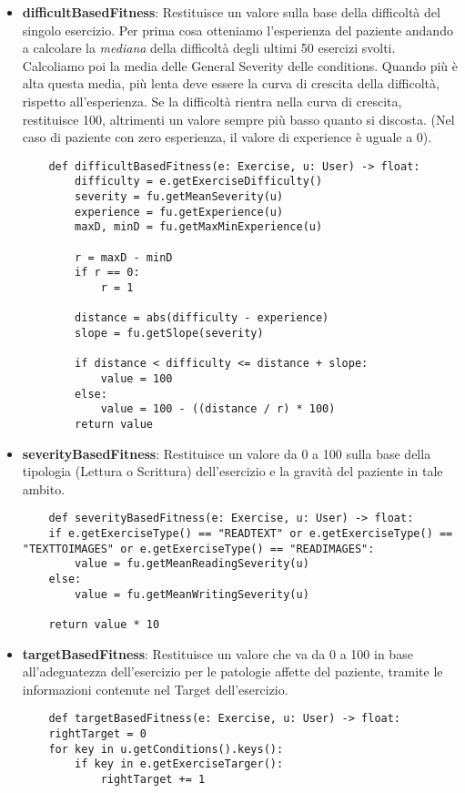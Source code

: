 \documentclass{article}
\begin{document}
\begin{itemize}

\item\textbf{difficultBasedFitness}: Restituisce un valore sulla base della difficoltà del singolo esercizio. Per prima cosa otteniamo l'esperienza del paziente andando a calcolare la \textit{mediana} della difficoltà degli ultimi 50 esercizi svolti. Calcoliamo poi la media delle General Severity delle conditions. Quando più è alta questa media, più lenta deve essere la curva di crescita della difficoltà, rispetto all'esperienza. Se la difficoltà rientra nella curva di crescita, restituisce 100, altrimenti un valore sempre più basso quanto si discosta. (Nel caso di paziente con zero esperienza, il valore di experience è uguale a 0).
\begin{lstlisting}
    def difficultBasedFitness(e: Exercise, u: User) -> float:
        difficulty = e.getExerciseDifficulty()
        severity = fu.getMeanSeverity(u)
        experience = fu.getExperience(u)
        maxD, minD = fu.getMaxMinExperience(u)

        r = maxD - minD
        if r == 0:
            r = 1

        distance = abs(difficulty - experience)
        slope = fu.getSlope(severity)

        if distance < difficulty <= distance + slope:
            value = 100
        else:
            value = 100 - ((distance / r) * 100)
        return value
\end{lstlisting}


\item\textbf{severityBasedFitness}: Restituisce un valore da 0 a 100 sulla base della tipologia (Lettura o Scrittura) dell'esercizio e la gravità del paziente in tale ambito.
\begin{lstlisting}
    def severityBasedFitness(e: Exercise, u: User) -> float:
    if e.getExerciseType() == "READTEXT" or e.getExerciseType() == "TEXTTOIMAGES" or e.getExerciseType() == "READIMAGES":
        value = fu.getMeanReadingSeverity(u)
    else:
        value = fu.getMeanWritingSeverity(u)

    return value * 10
\end{lstlisting}



\item\textbf{targetBasedFitness}: Restituisce un valore che va da 0 a 100 in base all'adeguatezza dell'esercizio per le patologie affette del paziente, tramite le informazioni contenute nel Target dell'esercizio.
\begin{lstlisting}
    def targetBasedFitness(e: Exercise, u: User) -> float:
    rightTarget = 0
    for key in u.getConditions().keys():
        if key in e.getExerciseTarger():
            rightTarget += 1


\end{lstlisting}
\end{itemize}
\end{document}
